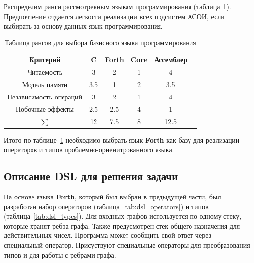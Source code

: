 \documentclass[russian,utf8,emptystyle]{eskdtext}
\begin{document}
\begin{spacing}{1.5}
Распределим ранги рассмотренным языкам программирования (таблица~\ref{tab:language_table}). Предпочтение отдается легкости реализации всех подсистем АСОИ, если выбирать за основу данных язык программирования.

\begin{table}[h!]
\centering
\caption{Таблица рангов для выбора базисного языка программирования}
\label{tab:language_table}
\begin{tabular}{c|c|c|c|c|c}
Критерий & C & Forth & Core & Ассемблер \\ 
\hline 
Читаемость             & 3   & 2     & 1 & 4 \\ 
\hline 
Модель памяти          & 3.5 & 1     & 2 & 3.5 \\ 
\hline 
Независимость операций & 3   & 2     & 1 & 4 \\ 
\hline 
Побочные эффекты       & 2.5 & 2.5   & 4 & 1 \\
\hline
$\sum$                 & 12  & 7.5   & 8 & 12.5
\end{tabular} 
\end{table}

Итого по таблице~\ref{tab:language_table} необходимо выбрать язык \textbf{Forth} как базу для реализации операторов и типов проблемно-ориенитрованного языка.

\subsection{Описание DSL для решения задачи}

На основе языка \textbf{Forth}, который был выбран в предыдущей части, был разработан набор операторов (таблица~\ref{tab:dsl_operators}) и типов (таблица~\ref{tab:dsl_types}). Для входных графов используется по одному стеку, которые хранят ребра графа. Также предусмотрен стек общего назначения для действительных чисел. Программа может сообщить свой ответ через специальный оператор. Присуствуют специальные операторы для преобразования типов и для работы с ребрами графа.


\end{spacing}
\end{document}
